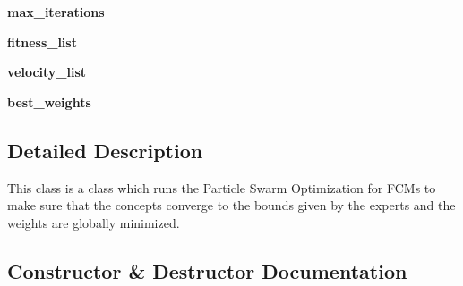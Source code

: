 \begin{DoxyCompactItemize}
{\bfseries max\+\_\+iterations}
\item 
\hypertarget{class_particle___swarm___optimization_1_1_p_s_o_ae6a19613b5aaa8ec64fcf4b7c27743a1}{}\label{class_particle___swarm___optimization_1_1_p_s_o_ae6a19613b5aaa8ec64fcf4b7c27743a1} 
{\bfseries fitness\+\_\+list}
\item 
\hypertarget{class_particle___swarm___optimization_1_1_p_s_o_a04d287712fa8a98e8482dccf35dbc562}{}\label{class_particle___swarm___optimization_1_1_p_s_o_a04d287712fa8a98e8482dccf35dbc562} 
{\bfseries velocity\+\_\+list}
\item 
\hypertarget{class_particle___swarm___optimization_1_1_p_s_o_a079f0fb7cd69fde03cbe5409c9113cf7}{}\label{class_particle___swarm___optimization_1_1_p_s_o_a079f0fb7cd69fde03cbe5409c9113cf7} 
{\bfseries best\+\_\+weights}
\end{DoxyCompactItemize}


\subsection{Detailed Description}
\begin{DoxyVerb}This class is a class which runs the Particle Swarm Optimization for FCMs to make
sure that the concepts converge to the bounds given by the experts and the weights
are globally minimized.\end{DoxyVerb}
 

\subsection{Constructor \& Destructor Documentation}
\hypertarget{class_particle___swarm___optimization_1_1_p_s_o_add702c734a63162dbe1cbfd6f94f26f7}{}\label{class_particle___swarm___optimization_1_1_p_s_o_add702c734a63162dbe1cbfd6f94f26f7} 
